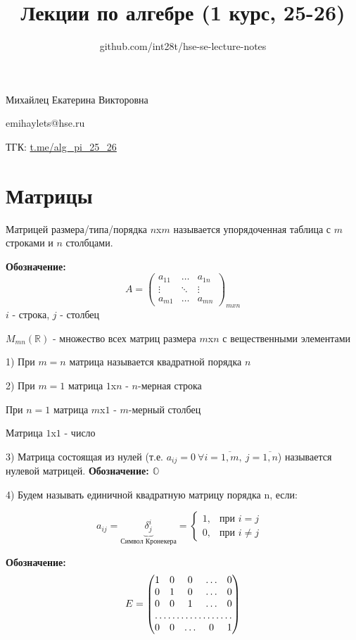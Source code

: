 \documentclass[a4paper,12pt]{article}
\title{Лекции по алгебре (1 курс, 25-26)}
\author{github.com/int28t/hse-se-lecture-notes}
\date{}
\begin{document}
    \pagestyle{empty}
	\maketitle
	\begin{flushright}
		Михайлец Екатерина Викторовна

		emihaylets@hse.ru

		ТГК: \url{t.me/alg_pi_25_26}
	\end{flushright}
	\tableofcontents{}
    \newpage
    \pagestyle{plain}
	\section {Матрицы}
	Матрицей размера/типа/порядка $n$x$m$ называется упорядоченная таблица с $m$ строками и $n$ столбцами.

	{\bf Обозначение: }
	\[
		A = 
		\begin{pmatrix}
			a_{11} & \ldots & a_{1n} \\
			\vdots & \ddots & \vdots \\
			a_{m1} & \ldots & a_{mn} 
		\end{pmatrix}
		_{mxn}
	\]
	$i$ - строка, $j$ - столбец

	$M_{mn}(\mathbb{R})$ - множество всех матриц размера $m$x$n$ с вещественными элементами

	1) При $m = n$ матрица называется квадратной порядка $n$

	2) При $m = 1$ матрица $1$x$n$ - $n$-мерная строка

	При $n = 1$ матрица $m$x$1$ - $m$-мерный столбец

	Матрица $1$x$1$ - число

	3) Матрица состоящая из нулей (т.е. $a_{ij}=0~\forall i = \overline{1, m},~j = \overline{1, n}$) называется нулевой матрицей.
	{\bf Обозначение: $\mathbb{O}$ }

	4) Будем называть единичной квадратную матрицу порядка n, если:

	\[
		a_{ij}=\underbrace{\delta^i_j}_{\text{Символ Кронекера}}=
		\begin{cases}
			1, & \text{при  $i = j$ } \\
			0, & \text{при  $i \neq j$}
		\end{cases}
	\]

	{\bf Обозначение: }
	\[
		E = \begin{pmatrix}
			1 & 0 & 0 & \ldots & 0 \\
			0 & 1 & 0 & \ldots & 0 \\
			0 & 0 & 1 & \ldots & 0 \\
			\hdotsfor{5} \\
			0 & 0 & \ldots & 0 & 1
			\end{pmatrix}
	\]
\end{document}
